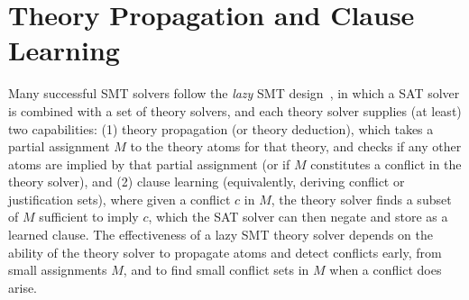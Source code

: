 \documentclass[runningheads]{llncs}
\newcommand{\comments}[1]{}
\begin{document}
\comments{
that does not contain the edge corresponding to a theory atom $edge_a$,
then adding that edge to $G$ cannot render $v$ unreacheable from $u$
(property \ref{condition:under}); conversely, if node $v$ cannot be
reached from $u$ in a graph containing the edge corresponding to $edge_a$,
then removing the edge cannot make $v$ reachable (property \ref{condition:over}).
}
\comments{
The notion of a monotonic predicate is explored in~\cite{bradley2007checking,bradley2008property,marques2013minimal}, in the context of finding a minimal models and unsatisfying subsets of a formula. Briefly, a predicate $p$ : $2^S \mapsto \{\text{true},\text{false}\}$ is monotone if $p$ is a unate function of its arguments (the above sources also require the predicate to hold for at least some arguments). Defined with respect to the atoms of $S$, the predicates in set $P$ in monotonic theory $T$ are examples of monotonic predicates. However, we observe two important distinctions: First, condition (\ref{condition:mono}) only requires that it be possible to define the $P$-predicates as monotonic predicates over the $S$-atoms without changing the satisfiability status of assignments to the theory; it does not require that they actually must be defined this way in the theory language. For example, monotonic theories we introduce in this paper will contain $P$-predicates which take as arguments integers and other objects.  Secondly, a theory may contain a monotonic predicate without satisfying condition (\ref{condition:mono}); we will describe ways that this can occur in \autoref{sec:equality}.
}


\section{Theory Propagation and Clause Learning\label{sec:propagation}}



Many successful SMT solvers follow the \textit{lazy} SMT
design~\cite{sebastiani2007lazy,de2008z3}, in which a SAT solver is
combined with a set of theory solvers, and each theory solver supplies
(at least) two capabilities:  (1) theory propagation (or
theory deduction), which takes a partial assignment $M$ to the theory
atoms for that theory, and checks if any other atoms are implied by
that partial assignment (or if $M$ constitutes a conflict in the theory
solver), and (2) clause learning (equivalently, deriving conflict
or justification sets), where given a conflict $c$ in $M$, the theory
solver finds a subset of $M$ sufficient to imply $c$, which the SAT
solver can then negate and store as a learned clause. The effectiveness
of a lazy SMT theory solver depends on the ability of the theory solver
to propagate atoms and detect conflicts early, from small assignments $M$, and to
find small conflict sets in $M$ when a conflict does arise.
\end{document}
